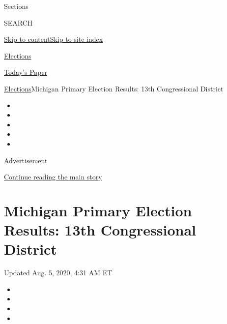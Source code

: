 Sections

SEARCH

\protect\hyperlink{site-content}{Skip to
content}\protect\hyperlink{site-index}{Skip to site index}

\href{https://www.nytimes3xbfgragh.onion/news-event/2020-election}{Elections}

\href{https://myaccount.nytimes3xbfgragh.onion/auth/login?response_type=cookie\&client_id=vi}{}

\href{https://www.nytimes3xbfgragh.onion/section/todayspaper}{Today's
Paper}

\href{/news-event/2020-election}{Elections}\textbar{}Michigan Primary
Election Results: 13th Congressional District

\begin{itemize}
\item
\item
\item
\item
\item
\end{itemize}

Advertisement

\protect\hyperlink{after-top}{Continue reading the main story}

\hypertarget{michigan-primary-election-results-13th-congressional-district}{%
\section{Michigan Primary Election Results: 13th Congressional
District}\label{michigan-primary-election-results-13th-congressional-district}}

Updated Aug. 5, 2020, 4:31 AM ET

\begin{itemize}
\item
\item
\item
\item
\end{itemize}

